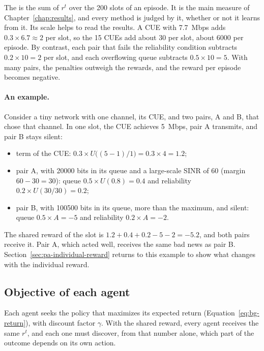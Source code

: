 The  is the sum of $r^t$ over the 200 slots of an episode. It is the main measure
of Chapter~\ref{chap:results}, and every method is judged by it, whether or not it learns from it. Its scale
helps to read the results. A \ac{CUE} with \SI{7.7}{Mbps} adds $0.3 \times 6.7 \approx 2$ per slot, so the
15 \acp{CUE} add about 30 per slot, about 6000 per episode. By contrast, each pair that fails the
reliability condition subtracts $0.2 \times 10 = 2$ per slot, and each overflowing queue subtracts
$0.5 \times 10 = 5$. With many pairs, the penalties outweigh the rewards, and the reward per episode becomes
negative.

\paragraph{An example.} Consider a tiny network with one channel, its \ac{CUE}, and two pairs, A and B, that
chose that channel. In one slot, the \ac{CUE} achieves \SI{5}{Mbps}, pair A transmits, and pair B stays
silent:
\begin{itemize}[nosep]
  \item term of the \ac{CUE}: $0.3 \times U\bigl((5-1)/1\bigr) = 0.3 \times 4 = 1.2$;
  \item pair A, with \num{20000} bits in its queue and a large-scale \ac{SINR} of 60 (margin
    $60 - 30 = 30$): queue $0.5 \times U(0.8) = 0.4$ and reliability $0.2 \times U(30/30) = 0.2$;
  \item pair B, with \num{100500} bits in its queue, more than the maximum, and silent: queue
    $0.5 \times A = -5$ and reliability $0.2 \times A = -2$.
\end{itemize}
The shared reward of the slot is $1.2 + 0.4 + 0.2 - 5 - 2 = -5.2$, and both pairs receive it. Pair A, which
acted well, receives the same bad news as pair B. Section~\ref{sec:pa-individual-reward} returns to this
example to show what changes with the individual reward.

\subsection{Objective of each agent}
\label{sec:sm-objective}

Each agent seeks the policy that maximizes its expected return (Equation~\ref{eq:bg-return}), with discount
factor $\gamma$. With the shared reward, every agent receives the same $r^t$, and each one must discover,
from that number alone, which part of the outcome depends on its own action.

